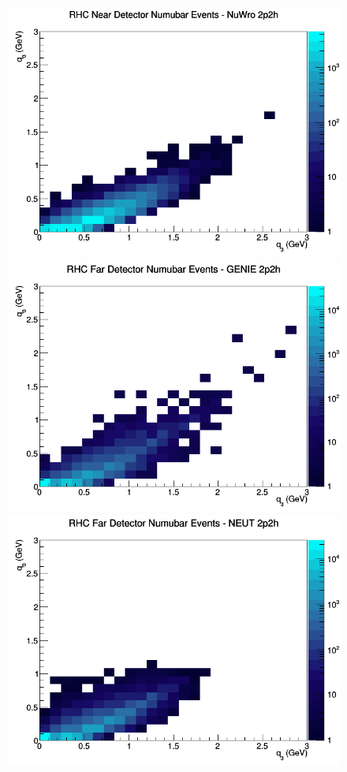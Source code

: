 \documentclass[12pt]{article}
\begin{document}
\begin{figure}[h]
\includegraphics[width=\linewidth]{eff_q0_q3/GAr/2p2h_RHC_ND_numubar_q3_q0_NuWro.png}
\endminipage
\newline
{}
\includegraphics[width=\linewidth]{eff_q0_q3/GAr/2p2h_RHC_FD_numubar_q3_q0_GENIE.png}
\endminipage
{}
\includegraphics[width=\linewidth]{eff_q0_q3/GAr/2p2h_RHC_FD_numubar_q3_q0_NEUT.png}

\end{figure}
\end{document}
